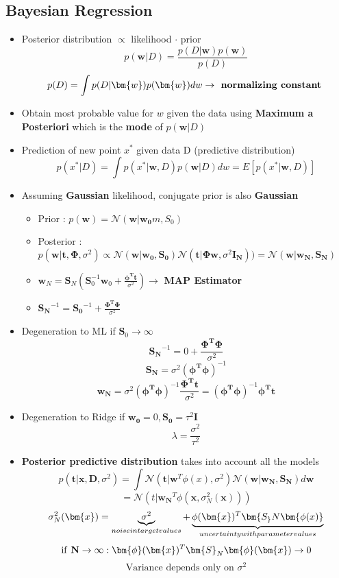 \documentclass[12pt]{article} %
\begin{document}
\subsection{Bayesian Regression}
\begin{itemize}
\item Posterior distribution $\propto$ likelihood $\cdot$ prior
$$ p(\bm{w}|D) =\frac{p(D| \bm{w})p(\bm{w})}{p(D)}$$
$$ p(D) = \int p(D|\bm{w})p(\bm{w}) dw \rightarrow \text{\textbf{ normalizing constant }}$$

\item Obtain most probable value for $w$ given the data using \textbf{Maximum a Posteriori} which is the \textbf{mode} of $p(\bm{w}|D)$

\item Prediction of new point $x^*$ given data D (predictive distribution)
$$ p(x^*|D) = \int p(x^*|\bm{w},D)p(\bm{w}|D)dw = E[p(x^* |\bm{w},D)]$$

\item Assuming \textbf{Gaussian} likelihood, conjugate prior is also \textbf{Gaussian}
\begin{itemize}
\item Prior : $p(\bm{w}) = \mathcal{N}(\bm{w}|\bm{w_0}m,S_0)$
\item Posterior : $p(\bm{w}|\bm{t,\Phi},\sigma^2) \propto \mathcal{N}(\bm{w}|\bm{w_0,S_0}) \mathcal{N}(\bm{t}|\bm{\Phi w},\sigma^2 \bm{I_N})) = \mathcal{N}(\bm{w}|\bm{w_N,S_N})$
\item $\bm{w}_N = \bm{S}_N \left( \bm{S}_0^{-1}\bm{w}_0 + \frac{\bm{\phi^T t}}{\sigma^2}  \right) \rightarrow$ \textbf{MAP Estimator}
\item $\bm{S_N}^{-1} = \bm{S_0}^{-1} + \frac{\bm{\Phi^T \Phi}}{\sigma^2}$
\end{itemize}

\item Degeneration to ML if $\bm{S}_0 \rightarrow \infty$ 
$$ \bm{S_N}^{-1} = 0 + \frac{\bm{\Phi^T \Phi}}{\sigma^2}$$
$$ \bm{S_N} = \sigma^2 (\bm{\phi^T \phi})^{-1}$$
$$ \bm{w_N} = \sigma^2 (\bm{\phi^T \phi})^{-1} \frac{\bm{\Phi^T t}}{\sigma^2} = (\bm{\phi^T \phi})^{-1} \bm{\phi^T t}  $$

\item Degeneration to Ridge if $\bm{w_0}=0 , \bm{S_0} =\tau^2\bm{I}$
$$ \lambda = \frac{\sigma^2}{\tau^2}$$

\item \textbf{Posterior predictive distribution} takes into account all the models
$$ p(\bm{t} | \bm{x,D} ,\sigma^2) = \int \mathcal{N} (\bm{t}| \bm{w}^T \phi(x),\sigma^2)\mathcal{N}(\bm{w}| \bm{w_N, S_N})d\bm{w}$$
$$ = \mathcal{N}(t| \bm{w_N}^T \phi(\bm{x},\sigma^2_N(\bm{x})))$$
$$ \sigma^2_N(\bm{x}) = \underbrace{\sigma^2}_{noise in target values} + \underbrace{\phi(\bm{x})^T\bm{S_}N \bm{\phi(x)}}_{uncertainty with parameter values}$$
$$\text{if \textbf{N}} \rightarrow \infty  : \bm{\phi}(\bm{x})^T\bm{S}_N \bm{\phi}(\bm{x}) \rightarrow 0 $$
$$ \text{Variance depends only on  } \sigma^2$$ 
\end{itemize}
\end{document}
